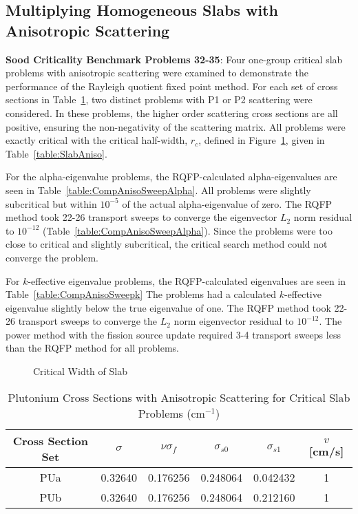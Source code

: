 \subsection{Multiplying Homogeneous Slabs with Anisotropic Scattering}

\textbf{Sood Criticality Benchmark Problems 32-35}: Four one-group critical slab problems with anisotropic scattering were examined to demonstrate the performance of the Rayleigh quotient fixed point method. For each set of cross sections in Table~\ref{table:SoodPUAniso}, two distinct problems with P1 or P2 scattering were considered. In these problems, the higher order scattering cross sections are all positive, ensuring the non-negativity of the scattering matrix. All problems were exactly critical with the critical half-width, $r_{c}$, defined in Figure~\ref{fig:SlabCritWidth}, given in Table~\ref{table:SlabAniso}.

For the alpha-eigenvalue problems, the RQFP-calculated alpha-eigenvalues are seen in Table~\ref{table:CompAnisoSweepAlpha}. All problems were slightly subcritical but within $10^{-5}$ of the actual alpha-eigenvalue of zero. The RQFP method took 22-26 transport sweeps to converge the eigenvector $L_{2}$ norm residual to $10^{-12}$ (Table~\ref{table:CompAnisoSweepAlpha}). Since the problems were too close to critical and slightly subcritical, the critical search method could not converge the problem.

For $k$-effective eigenvalue problems, the RQFP-calculated eigenvalues are seen in Table~\ref{table:CompAnisoSweepk} The problems had a calculated $k$-effective eigenvalue slightly below the true eigenvalue of one. The RQFP method took 22-26 transport sweeps to converge the $L_{2}$ norm eigenvector residual to $10^{-12}$. The power method with the fission source update required 3-4 transport sweeps less than the RQFP method for all problems.

\begin{figure}[!htbp]
	\centering
	
	\caption{Critical Width of Slab}
	\label{fig:SlabCritWidth}
\end{figure}

\begin{table}[!htbp]
	\caption{Plutonium Cross Sections with Anisotropic Scattering for Critical Slab Problems (cm$^{-1}$) \cite{sood2003analytical}}
	\label{table:SoodPUAniso}
	\centering{}
    \begin{tabular}{*6c}
        \toprule
	Cross Section Set & $\sigma$ & $\nu \sigma_{f}$ & $\sigma_{s0}$  & $\sigma_{s1}$ & $v$ [cm/s] \\ 
        \midrule
	PUa & 0.32640 & 0.176256 & 0.248064 & 0.042432 & 1 \\
	PUb & 0.32640 & 0.176256 & 0.248064 & 0.212160 & 1 \\
        \bottomrule
    \end{tabular}
\end{table}

